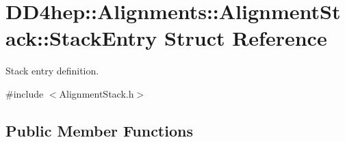 \hypertarget{struct_d_d4hep_1_1_alignments_1_1_alignment_stack_1_1_stack_entry}{}\section{D\+D4hep\+:\+:Alignments\+:\+:Alignment\+Stack\+:\+:Stack\+Entry Struct Reference}
\label{struct_d_d4hep_1_1_alignments_1_1_alignment_stack_1_1_stack_entry}


Stack entry definition.  




{\ttfamily \#include $<$Alignment\+Stack.\+h$>$}

\subsection*{Public Member Functions}
